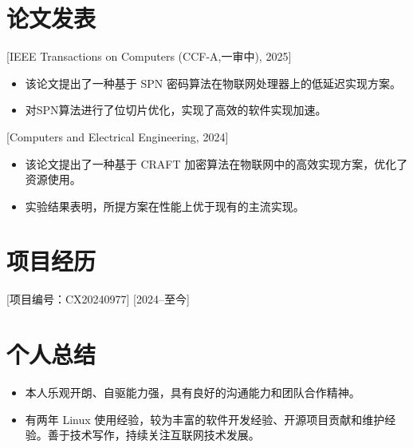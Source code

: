\documentclass{resume}
\begin{document}
\section{论文发表}

[IEEE Transactions on Computers (CCF-A,一审中), 2025]
\begin{itemize}
  \item 该论文提出了一种基于 SPN 密码算法在物联网处理器上的低延迟实现方案。
  \item 对SPN算法进行了位切片优化，实现了高效的软件实现加速。
\end{itemize}

[Computers and Electrical Engineering, 2024]
\begin{itemize}
  \item 该论文提出了一种基于 CRAFT 加密算法在物联网中的高效实现方案，优化了资源使用。
  \item 实验结果表明，所提方案在性能上优于现有的主流实现。
\end{itemize}

\section{项目经历}
[项目编号：CX20240977]
[2024--至今]

\section{个人总结}

\begin{itemize}
  \item 本人乐观开朗、自驱能力强，具有良好的沟通能力和团队合作精神。
  \item 有两年 Linux 使用经验，较为丰富的软件开发经验、开源项目贡献和维护经验。善于技术写作，持续关注互联网技术发展。
\end{itemize}
\end{document}
